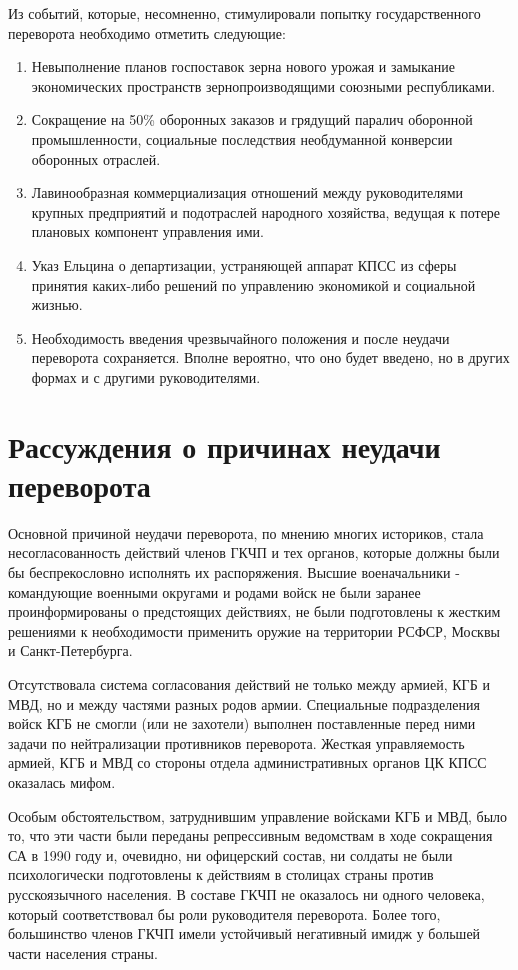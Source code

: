 \documentclass[12pt]{extarticle}
\begin{document}
Из событий, которые, несомненно, стимулировали попытку государственного переворота необходимо отметить следующие:
\begin{enumerate}
\item Невыполнение планов госпоставок зерна нового урожая и замыкание экономических пространств зернопроизводящими союзными республиками.

\item Сокращение на 50\% оборонных заказов и грядущий паралич оборонной промышленности, социальные последствия необдуманной конверсии оборонных отраслей.

\item Лавинообразная коммерциализация отношений между руководителями крупных предприятий и подотраслей народного хозяйства, ведущая к потере плановых компонент управления ими.

\item Указ Ельцина о департизации, устраняющей аппарат КПСС из сферы принятия каких-либо решений по управлению экономикой и социальной жизнью.

\item Необходимость введения чрезвычайного положения и после неудачи переворота сохраняется. Вполне вероятно, что оно будет введено, но в других формах и с другими руководителями.
\end{enumerate}

\section{Рассуждения о причинах неудачи переворота}
Основной причиной неудачи переворота, по мнению многих историков, стала несогласованность действий членов ГКЧП и тех органов, которые должны были бы беспрекословно исполнять их распоряжения. Высшие военачальники - командующие военными округами и родами войск не были заранее проинформированы о предстоящих действиях, не были подготовлены к жестким решениями к необходимости применить оружие на территории РСФСР, Москвы и Санкт-Петербурга.

Отсутствовала система согласования действий не только между армией, КГБ и МВД, но и между частями разных родов армии. Специальные подразделения войск КГБ не смогли (или не захотели) выполнен поставленные перед ними задачи по нейтрализации противников переворота. Жесткая управляемость армией, КГБ и МВД со стороны отдела административных органов ЦК КПСС оказалась мифом.

Особым обстоятельством, затруднившим управление войсками КГБ и МВД, было то, что эти части были переданы репрессивным ведомствам в ходе сокращения СА в 1990 году и, очевидно, ни офицерский состав, ни солдаты не были психологически подготовлены к действиям в столицах страны против русскоязычного населения. В составе ГКЧП не оказалось ни одного человека, который соответствовал бы роли руководителя переворота. Более того, большинство членов ГКЧП имели устойчивый негативный имидж у большей части населения страны.
\end{document}
